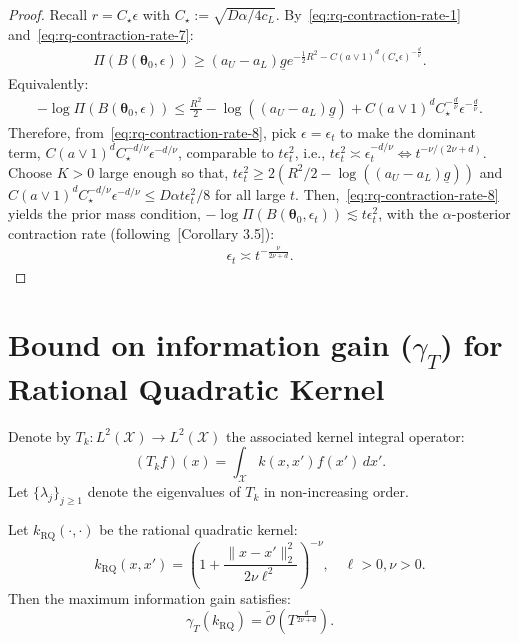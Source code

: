 \documentclass[final,12pt]{colt2026} %
\begin{document}
\begin{proof}
Recall $r = C_{\star}\epsilon$ with $C_{\star} := \sqrt{D\alpha/4c_L}$. By~\eqref{eq:rq-contraction-rate-1} and~\eqref{eq:rq-contraction-rate-7}:
\begin{align*}
\Pi\left(B(\pmb\theta_0, \epsilon)\right) \geq (a_U-a_L) \underline{g} e^{-\frac{1}{2}R^{2} - C(a\vee 1)^{d} (C_{\star}\epsilon)^{-\frac{d}{\nu}}}.
\end{align*}
Equivalently:
\begin{align}
\label{eq:rq-contraction-rate-8}
-\log \Pi\left(B(\pmb\theta_0, \epsilon)\right) \leq \frac{R^2}{2} - \log((a_U-a_L)\underline{g}) + C(a\vee 1)^{d}C_{\star}^{-\frac{d}{\nu}}\epsilon^{-\frac{d}{\nu}}.
\end{align}
Therefore, from~\eqref{eq:rq-contraction-rate-8}, pick $\epsilon = \epsilon_t$ to make the dominant term, $C(a\vee 1)^{d}C_{\star}^{-d/\nu}\epsilon^{-d/\nu}$, comparable to $t\epsilon_t^2$, i.e., $t\epsilon_t^2 \asymp \epsilon_t^{-d/\nu} \iff t^{-\nu / (2\nu+d)}$. Choose $K>0$ large enough so that, $t\epsilon_t^2 \geq 2(R^2/2 - \log((a_U-a_L)\underline{g}))$ and $C(a\vee 1)^{d}C_{\star}^{-d/\nu}\epsilon^{-d/\nu} \leq D\alpha t\epsilon_t^{2}/8$ for all large $t$. Then,~\eqref{eq:rq-contraction-rate-8} yields the prior mass condition, $-\log \Pi(B(\pmb\theta_0, \epsilon_t)) \lesssim t\epsilon_t^{2}$, with the $\alpha$-posterior contraction rate (following~\cite{bhattacharya2019bayesian}[Corollary 3.5]):
\begin{align}
\label{eq:rq-contraction-rate-9}
\epsilon_t \asymp t^{-\frac{\nu}{2\nu+d}}.
\end{align}
\end{proof}

\section{Bound on information gain ($\gamma_T$) for Rational Quadratic Kernel}
Denote by $T_k:L^2(\mathcal X)\to L^2(\mathcal X)$ the associated kernel
integral operator:
\[
(T_k f)(x) = \int_{\mathcal X} k(x,x') f(x') \, dx'.
\]
Let $\{\lambda_j\}_{j\ge1}$ denote the eigenvalues of $T_k$ in non-increasing order.

\begin{lemma}
\label{lem:rq-gamma}
Let $k_{\mathrm{RQ}}(\cdot, \cdot)$ be the rational quadratic kernel:
\[
k_{\mathrm{RQ}}(x,x')
=
\left(1 + \frac{\|x-x'\|^2_2}{2\nu\ell^2}\right)^{-\nu},
\quad \ell>0, \nu>0.
\]
Then the maximum information gain satisfies:
\[
\gamma_T(k_{\mathrm{RQ}})
=
\mathcal{\tilde O}\!\left(T^{\frac{d}{2\nu+d}}\right).
\]
\end{lemma}
\end{document}

